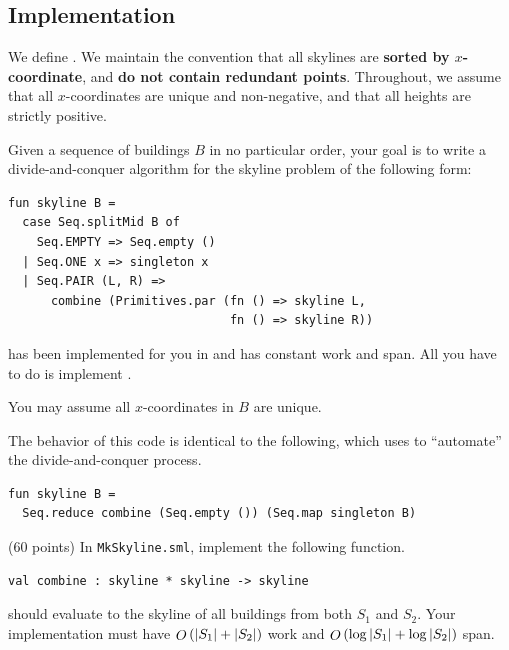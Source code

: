 \subsection{Implementation}

\begin{gram}
\label{gr:skyline::implement}
We define . We maintain the convention
that all skylines are \textbf{sorted by $x$-coordinate}, and \textbf{do not
contain redundant points}. Throughout, we assume that all $x$-coordinates are
unique and non-negative, and that all heights are strictly positive.

Given a sequence of buildings $B$ in no particular order, your goal is to write
a divide-and-conquer algorithm for the skyline problem of the following form:
\begin{verbatim}
fun skyline B =
  case Seq.splitMid B of
    Seq.EMPTY => Seq.empty ()
  | Seq.ONE x => singleton x
  | Seq.PAIR (L, R) =>
      combine (Primitives.par (fn () => skyline L,
                               fn () => skyline R))
\end{verbatim}
 has been implemented for you in  and has
constant work and span. All you have to do is implement .
\end{gram}

\begin{note}
You may assume all $x$-coordinates in $B$ are unique.
\end{note}

\begin{remark}
The behavior of this code is identical to the following, which uses
 to ``automate'' the divide-and-conquer process.
\begin{verbatim}
fun skyline B =
  Seq.reduce combine (Seq.empty ()) (Seq.map singleton B)
\end{verbatim}
\end{remark}

\begin{task}[1]
\label{task:skylinelab:1}
(60 points)
In \texttt{MkSkyline.sml}, implement the following function.
\begin{verbatim}
val combine : skyline * skyline -> skyline
\end{verbatim}
 should evaluate to the skyline of all buildings
from both $S_1$ and $S_2$. Your implementation must have $\mathop{O}\left(|S_1| + |S_2|\right)$ work
and $\mathop{O}\left(\log|S_1| + \log|S_2|\right)$ span.
\end{task}

